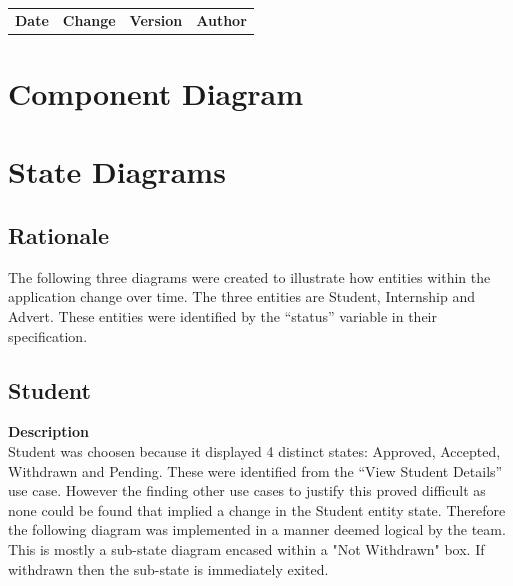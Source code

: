 \documentclass{l3deliverable}
\begin{document}
\begin{center}{
\begin{tabular}{|c|c|c|c|}
\hline \textbf{Date} &\textbf{ Change} & \textbf{Version} &\textbf{Author}\\ 
\end{tabular} }
\end{center}


\section{Component Diagram}


\section{State Diagrams}

\subsection{Rationale}

The following three diagrams were created to illustrate how entities within the application change over time. The three entities are Student, Internship and Advert. These entities were identified by the ``status'' variable in their specification. \\

\subsection{Student}
\textbf{Description} \\

Student was choosen because it displayed 4 distinct states: Approved, Accepted, Withdrawn and Pending. These were identified from the ``View Student Details'' use case. However the finding other use cases to justify this proved difficult as none could be found that implied a change in the Student entity state. Therefore the following diagram was implemented in a manner deemed logical by the team. This is mostly a sub-state diagram encased within a "Not Withdrawn" box. If withdrawn then the sub-state is immediately exited.
\end{document}
